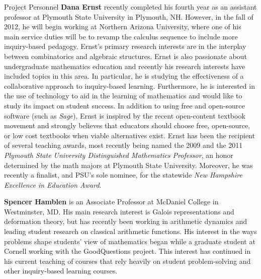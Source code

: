 \documentclass[11pt]{article}
\begin{document}
\begin{section}{Project Personnel}
\textbf{Dana Ernst} recently completed his fourth year as an assistant
professor at Plymouth State University in Plymouth, NH.  However, in the
fall of 2012, he will begin working at Northern Arizona University, where
one of his main service duties will be to revamp the calculus sequence to
include more inquiry-based pedagogy.  Ernst's primary research interests
are in the interplay between combinatorics and algebraic structures.
Ernst is also passionate about undergraduate mathematics education and
recently his research interests have included topics in this area. In
particular, he is studying the effectiveness of a collaborative approach
to inquiry-based learning.  Furthermore, he is interested in the use of
technology to aid in the learning of mathematics and would like to study
its impact on student success.  In addition to using free and open-source
software (such as \emph{Sage}), Ernst is inspired by the recent
open-content textbook movement and strongly believes that educators should
choose free, open-source, or low cost textbooks when viable alternatives
exist.  Ernst has been the recipient of several teaching awards, most
recently being named the 2009 and the 2011 \emph{Plymouth State University
Distinguished Mathematics Professor}, an honor determined by the math
majors at Plymouth State University.  Moreover, he was recently a
finalist, and PSU's sole nominee, for the statewide \emph{New Hampshire
Excellence in Education Award}.

\textbf{Spencer Hamblen} is an Associate Professor at McDaniel College in
Westminster, MD.  His main research interest is Galois representations and
deformation theory, but has recently been working in arithmetic dynamics
and leading student research on classical arithmetic functions.  His
interest in the ways problems shape students' view of mathematics began
while a graduate student at Cornell working with the GoodQuestions
project.  This interest has continued in his current teaching of courses
that rely heavily on student problem-solving and other inquiry-based
learning courses.


\end{section}
\end{document}
